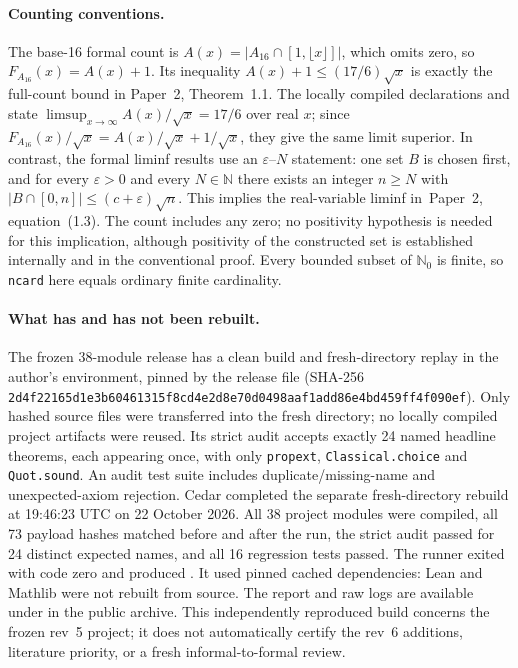 \documentclass[11pt]{article}
\newcommand{\N}{\mathbb N_0}
\newcommand{\card}[1]{\lvert #1\rvert}
\begin{document}
\paragraph{Counting conventions.}
The base-16 formal count is $A(x)=\card{A_{16}\cap[1,\lfloor x\rfloor]}$, which omits zero, so $F_{A_{16}}(x)=A(x)+1$. Its inequality $A(x)+1\le(17/6)\sqrt{x}$ is exactly the full-count bound in Paper~2, Theorem~1.1. The locally compiled declarations  and  state $\limsup_{x\to\infty}A(x)/\sqrt x=17/6$ over real $x$; since $F_{A_{16}}(x)/\sqrt x=A(x)/\sqrt x+1/\sqrt x$, they give the same limit superior. In contrast, the formal liminf results use an $\varepsilon$--$N$ statement: one set $B$ is chosen first, and for every $\varepsilon>0$ and every $N\in\mathbb N$ there exists an integer $n\ge N$ with $\card{B\cap[0,n]}\le(c+\varepsilon)\sqrt n$. This implies the real-variable liminf in~Paper~2, equation~(1.3). The count includes any zero; no positivity hypothesis is needed for this implication, although positivity of the constructed set is established internally and in the conventional proof. Every bounded subset of $\N$ is finite, so \texttt{ncard} here equals ordinary finite cardinality.

\paragraph{What has and has not been rebuilt.}
The frozen 38-module release has a clean build and fresh-directory replay in the author's environment, pinned by the release  file (SHA-256 \texttt{2d4f22165d1e3b60461315f8cd4e2d8e70d0498aaf1add86e4bd459ff4f090ef}). Only hashed source files were transferred into the fresh directory; no locally compiled project artifacts were reused. Its strict audit accepts exactly 24 named headline theorems, each appearing once, with only \texttt{propext}, \texttt{Classical.choice} and \texttt{Quot.sound}. An audit test suite includes duplicate/missing-name and unexpected-axiom rejection. Cedar completed the separate fresh-directory rebuild at 19:46:23 UTC on 22 October 2026. All 38 project modules were compiled, all 73 payload hashes matched before and after the run, the strict audit passed for 24 distinct expected names, and all 16 regression tests passed. The runner exited with code zero and produced . It used pinned cached dependencies: Lean and Mathlib were not rebuilt from source. The report and raw logs are available under  in the public archive. This independently reproduced build concerns the frozen rev~5 project; it does not automatically certify the rev~6 additions, literature priority, or a fresh informal-to-formal review.
\end{document}
